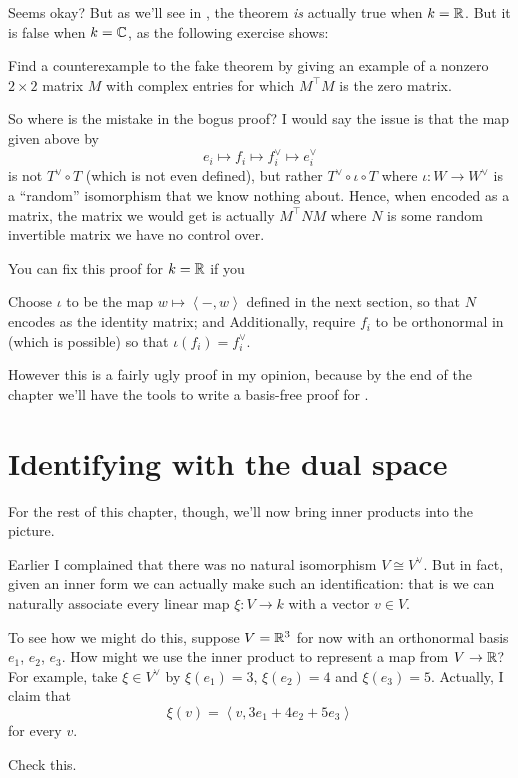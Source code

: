 Seems okay?
But as we'll see in , the theorem \emph{is}
actually true when $k = \mathbb R$.
But it is false when $k = \mathbb C$, as the following exercise shows:
\begin{exercise}
	Find a counterexample to the fake theorem
	by giving an example of a nonzero $2 \times 2$ matrix $M$ with complex entries
	for which $M^\top M$ is the zero matrix.
\end{exercise}

So where is the mistake in the bogus proof?
I would say the issue is that the map given above by
\[ e_i \mapsto f_i \mapsto f_i^\vee \mapsto e_i^\vee \]
is not $T^\vee \circ T$ (which is not even defined),
but rather $T^\vee \circ \iota \circ T$
where $\iota \colon W \to W^\vee$ is a ``random'' isomorphism that we know nothing about.
Hence, when encoded as a matrix,
the matrix we would get is actually $M^\top N M$
where $N$ is some random invertible matrix we have no control over.

You can fix this proof for $k = \mathbb R$ if you
\begin{itemize}
	\ii Choose $\iota$ to be the map $w \mapsto \left\langle -, w \right\rangle$
	defined in the next section, so that $N$ encodes as the identity matrix; and
	\ii Additionally, require $f_i$ to be orthonormal in 
	(which is possible) so that $\iota(f_i) = f_i^\vee$.
\end{itemize}
However this is a fairly ugly proof in my opinion,
because by the end of the chapter we'll have the tools to write
a basis-free proof for .

\section{Identifying with the dual space}
For the rest of this chapter, though,
we'll now bring inner products into the picture.

Earlier I complained that there was no natural isomorphism $V \cong V^\vee$.
But in fact, given an inner form
we can actually make such an identification:
that is we can naturally associate every linear map
$\xi \colon V \to k$ with a vector $v \in V$.

To see how we might do this, suppose $V = \mathbb R^3$
for now with an orthonormal basis $e_1$, $e_2$, $e_3$.
How might we use the inner product to
represent a map from $V \to \mathbb R$?
For example, take $\xi \in V^\vee$ by
$\xi(e_1) = 3$, $\xi(e_2) = 4$ and $\xi(e_3) = 5$.
Actually, I claim that
\[ \xi(v) = \left< v, 3e_1 + 4e_2 + 5e_3 \right> \]
for every $v$.
\begin{ques}
	Check this.
\end{ques}

